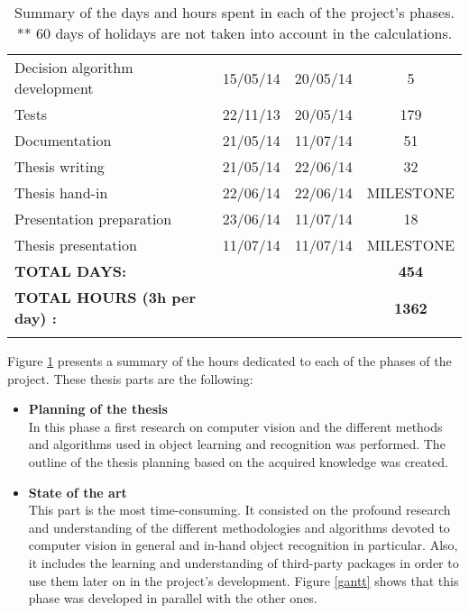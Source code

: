 \begin{appendices}
\begin{table}[H]
\begin{tabular} {l c c c }
\hspace*{0.5cm}	Decision algorithm development	&	15/05/14	&	20/05/14	&	5	\\
\hspace*{0.5cm}	Tests	&	22/11/13	&	20/05/14	&	179\\	
Documentation	&	21/05/14	&	11/07/14	&	51	\\
\hspace*{0.5cm}		Thesis writing	&	21/05/14	&	22/06/14	&	32	\\
\hspace*{0.5cm}		Thesis hand-in	&	22/06/14	&	22/06/14	&	MILESTONE	\\
\hspace*{0.5cm}		Presentation preparation		&	23/06/14	&	11/07/14	&	18	\\
\hspace*{0.5cm}		Thesis presentation		&	11/07/14	&	11/07/14	&	MILESTONE	\\

\addlinespace[3mm]
\bottomrule
\addlinespace[3mm]

\textbf{TOTAL DAYS: 	}		&&&\textbf{	454}	\\
\textbf{TOTAL HOURS (3h per day) :} &&&			\textbf{1362}	\\
\addlinespace[3mm]

\bottomrule
\end{tabular}
\caption[Days and hours per project phase]{Summary of the days and hours spent in each of the project's phases.\\
** 60 days of holidays are not taken into account in the calculations.}	
\label{phases}

\end{table}
\vspace*{0.5cm}


	Figure \ref{phases} presents a summary of the hours dedicated to each of the phases of the project. 
	These thesis parts are the following: 

		 \begin{itemize}
		 		\item{\textbf{Planning of the thesis}} \\
		 		In this phase a first research on computer vision and the different methods and algorithms used in object learning and recognition was performed. 
		 		The outline of the thesis planning based on the acquired knowledge was created. 

			 	\item{\textbf{State of the art}} \\
			 	This part is the most time-consuming.
			 	It consisted on the profound research and understanding of the different methodologies and algorithms devoted to computer vision in general and in-hand object recognition in particular. 
			 	Also, it includes the learning and understanding of third-party packages in order to use them later on in the project's development. 
			 	Figure \ref{gantt} shows that this phase was developed in parallel with the other ones. 


\end{itemize}
\end{appendices}
